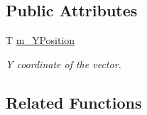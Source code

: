 \subsection*{Public Attributes}
\begin{DoxyCompactItemize}
\item 
T \hyperlink{class_triton_1_1_util_1_1_vector2_ae31b6d61a6efc64df0962052a71097b3}{m\+\_\+\+Y\+Position}
\begin{DoxyCompactList}\small\item\em Y coordinate of the vector. \end{DoxyCompactList}\end{DoxyCompactItemize}
\subsection*{Related Functions}
